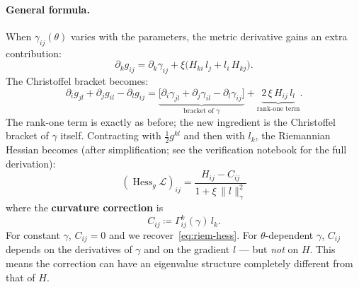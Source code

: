 \documentclass{article}
\newcommand{\loss}{\mathcal{L}}
\begin{document}
\paragraph{General formula.}
When $\gamma_{ij}(\theta)$ varies with the parameters,
the metric derivative gains an extra contribution:
\begin{equation}\label{eq:dg-learnable}
    \partial_k g_{ij}
    = \partial_k\gamma_{ij} + \xi\bigl(H_{ki}\,l_j + l_i\,H_{kj}\bigr).
\end{equation}
The Christoffel bracket becomes:
\begin{equation}
    \partial_i g_{jl} + \partial_j g_{il} - \partial_l g_{ij}
    = \underbrace{\bigl[\partial_i\gamma_{jl} + \partial_j\gamma_{il}
      - \partial_l\gamma_{ij}\bigr]}_{\text{bracket of }\gamma}
    + \underbrace{2\,\xi\,H_{ij}\,l_l}_{\text{rank-one term}}.
\end{equation}
The rank-one term is exactly as before;
the new ingredient is the Christoffel bracket of $\gamma$ itself.
Contracting with $\tfrac{1}{2}g^{kl}$ and then with $l_k$, the
Riemannian Hessian becomes (after simplification;
see the verification notebook for the full derivation):
\begin{equation}\label{eq:riem-hess-learnable}
    \boxed{\;
    (\operatorname{Hess}_g\loss)_{ij}
    = \frac{H_{ij} - C_{ij}}{1+\xi\,\|l\|_\gamma^2}
    \;}
\end{equation}
where the \textbf{curvature correction} is
\begin{equation}\label{eq:correction-learnable}
    C_{ij} \coloneqq \Gamma^k_{ij}(\gamma)\,l_k.
\end{equation}
For constant $\gamma$, $C_{ij}=0$ and we recover~\eqref{eq:riem-hess}.
For $\theta$-dependent $\gamma$, $C_{ij}$ depends on the derivatives
of $\gamma$ and on the gradient $l$ --- but \emph{not} on $H$.
This means the correction can have an eigenvalue structure
completely different from that of $H$.
\end{document}
